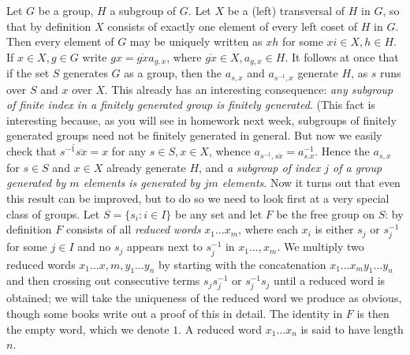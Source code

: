 Let $G$ be a group, $H$ a subgroup of $G$.  Let $X$ be a (left) transversal of $H$ in $G$, so that by definition $X$ consists of exactly one element of every left coset of $H$ in $G$.  Then every element of $G$ may be uniquely written as $xh$ for some $xi\in X,h\in H$.  If $x\in X,g\in G$ write 
$gx = \overline{gx}a_{g,x}$, where $\overline{gx}\in X,a_{g,x}\in H$.  It follows at once that if the set $S$ generates $G$ as a group, then the $a_{s,x}$ and $a_{s^{-1},x}$ generate $H$, as $s$ runs over $S$ and $x$ over $X$.  This already has an interesting consequence:  {\sl any subgroup of finite index in a finitely generated group is finitely generated}.  (This fact is interesting because, as you will see in homework next week, subgroups of finitely generated groups need not be finitely generated in general.  But now we easily check that $\overline{s^{-1}\overline{sx}}= x$ for any $s\in S,x\in X$, whence $a_{s^{-1},\overline{sx}} = a_{s.x}^{-1}$.  Hence the $a_{s,x}$ for $s\in S$ and $x\in X$ already generate $H$, and {\sl a subgroup of index $j$ of a group generated by $m$ elements is generated by $jm$ elements}.  Now it turns out that even this result can be improved, but to do so we need to look first at a very special class of groups.  Let $S=\{s_i:i\in I\}$ be any set and let $F$ be the free group on $S$:  by definition $F$ consists of all {\sl reduced words} $x_1\ldots x_m$, where each $x_i$ is either $s_j$ or $s_j^{-1}$ for some $j\in I$ and no $s_j$ appears next to $s_j^{-1}$ in
$x_1\ldots,x_m$.  We multiply two reduced words $x_1\ldots x,m,y_1\ldots y_n$ by starting with the concatenation $x_1\ldots x_m y_1\ldots y_n$ and then crossing out consecutive terms $s_j s_j^{-1}$ or $s_j^{-1} s_j$ until a reduced word is obtained; we will take the uniqueness of the reduced word we produce as obvious, though some books write out a proof of this in detail.  The identity in $F$ is then the empty word, which we denote $1$.  A reduced word $x_1\ldots x_n$ is said to have length $n$.

